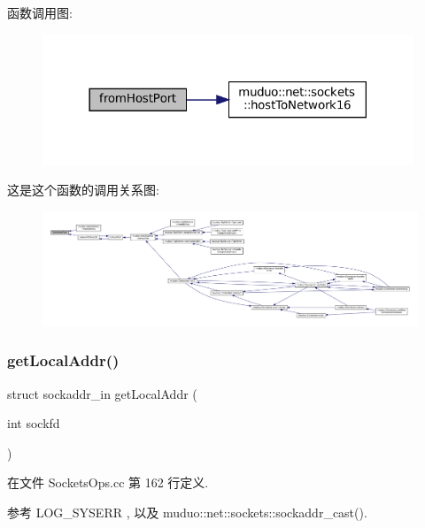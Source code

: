 函数调用图\+:
\nopagebreak
\begin{figure}[H]
\begin{center}
\leavevmode
\includegraphics[width=314pt]{namespacemuduo_1_1sockets_ae40b8bfde260835c9034bfaea0fb4ee0_cgraph}
\end{center}
\end{figure}
这是这个函数的调用关系图\+:
\nopagebreak
\begin{figure}[H]
\begin{center}
\leavevmode
\includegraphics[width=350pt]{namespacemuduo_1_1sockets_ae40b8bfde260835c9034bfaea0fb4ee0_icgraph}
\end{center}
\end{figure}
\mbox{\label{namespacemuduo_1_1sockets_a4b4793e2d3f77da7bab38cfb52274075}} 
\subsubsection{\texorpdfstring{get\+Local\+Addr()}{getLocalAddr()}}
{\footnotesize\ttfamily struct sockaddr\+\_\+in get\+Local\+Addr (\begin{DoxyParamCaption}\item[{int}]{sockfd }\end{DoxyParamCaption})}



在文件 Sockets\+Ops.\+cc 第 162 行定义.



参考 L\+O\+G\+\_\+\+S\+Y\+S\+E\+RR , 以及 muduo\+::net\+::sockets\+::sockaddr\+\_\+cast().



